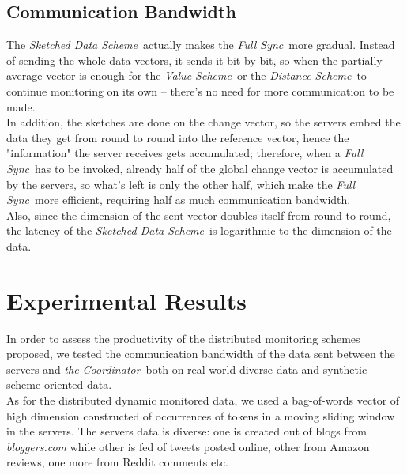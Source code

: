 \documentclass[10pt, conference]{IEEEtran}
\newcommand{\valueScheme}{\textit{Value Scheme}}
\newcommand{\distanceScheme}{\textit{Distance Scheme}}
\newcommand{\sketchScheme}{\textit{Sketched Data Scheme}}
\newcommand{\fullSync}{\textit{Full Sync}}
\newcommand{\theCoordinator}{\textit{the Coordinator}}
\begin{document}
\subsection{Communication Bandwidth}
The \sketchScheme \ actually makes the \fullSync \ more gradual. Instead of sending the whole data vectors, it sends it bit by bit, so when the partially average vector is enough for the \valueScheme \ or the \distanceScheme \ to continue monitoring on its own -- there's no need for more communication to be made. \\
In addition, the sketches are done on the change vector, so the servers embed the data they get from round to round into the reference vector, hence the "information" the server receives gets accumulated; therefore, when a \fullSync \ has to be invoked, already half of the global change vector is accumulated by the servers, so what's left is only the other half, which make the \fullSync \ more efficient, requiring half as much communication bandwidth. \\
Also, since the dimension of the sent vector doubles itself from round to round, the latency of the \sketchScheme \ is logarithmic to the dimension of the data.  

\section{Experimental Results}
In order to assess the productivity of the distributed monitoring schemes proposed, we tested the communication bandwidth of the data sent between the servers and \theCoordinator \ both on real-world diverse data and synthetic scheme-oriented data. \\
As for the distributed dynamic monitored data, we used a bag-of-words vector of high dimension constructed of occurrences of tokens in a moving sliding window in the servers. The servers data is diverse: one is created out of blogs from \textit{bloggers.com} while other is fed of tweets posted online, other from Amazon reviews, one more from Reddit comments etc.
\end{document}
